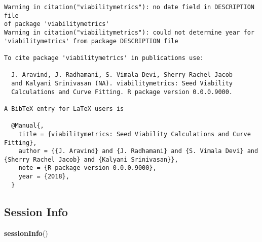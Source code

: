 \documentclass[]{article}
\newenvironment{Shaded}{\begin{snugshade}}{\end{snugshade}}
\newcommand{\KeywordTok}[1]{\textcolor[rgb]{0.13,0.29,0.53}{\textbf{#1}}}
\newcommand{\NormalTok}[1]{#1}
\begin{document}
\begin{verbatim}
Warning in citation("viabilitymetrics"): no date field in DESCRIPTION file
of package 'viabilitymetrics'
Warning in citation("viabilitymetrics"): could not determine year for
'viabilitymetrics' from package DESCRIPTION file

To cite package 'viabilitymetrics' in publications use:

  J. Aravind, J. Radhamani, S. Vimala Devi, Sherry Rachel Jacob
  and Kalyani Srinivasan (NA). viabilitymetrics: Seed Viability
  Calculations and Curve Fitting. R package version 0.0.0.9000.

A BibTeX entry for LaTeX users is

  @Manual{,
    title = {viabilitymetrics: Seed Viability Calculations and Curve Fitting},
    author = {{J. Aravind} and {J. Radhamani} and {S. Vimala Devi} and {Sherry Rachel Jacob} and {Kalyani Srinivasan}},
    note = {R package version 0.0.0.9000},
    year = {2018},
  }
\end{verbatim}

\hypertarget{session-info}{%
\subsection{Session Info}\label{session-info}}

\begin{Shaded}
\begin{Highlighting}[]
\KeywordTok{sessionInfo}\NormalTok{()}
\end{Highlighting}
\end{Shaded}
\end{document}
